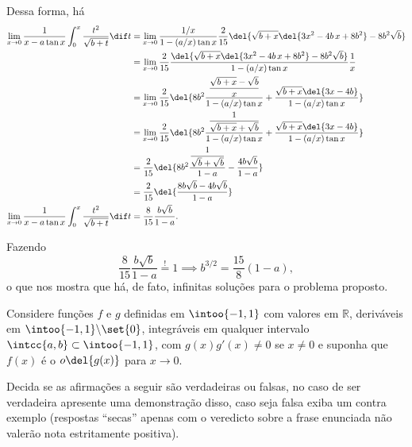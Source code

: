 \documentclass{IMTexam}
\begin{document}
\begin{questions}
\begin{solution}
            Dessa forma, há
            \begin{align*}
                \lim\limits_{x\to0}\dfrac{1}{x-a\tan x}\int_0^x \dfrac{t^2}{\sqrt{b+t}}\dif t
                &=\lim\limits_{x\to0}\dfrac{1/x}{1-(a/x)\tan x}\dfrac{2}{15}\del{\sqrt{b+x}\del{3x^2-4b\,x+8b^2}-8b^2\sqrt{b}}\\
                &=\lim\limits_{x\to0}\dfrac{2}{15}\dfrac{\del{\sqrt{b+x}\del{3x^2-4b\,x+8b^2}-8b^2\sqrt{b}}}{1-(a/x)\tan x}\dfrac{1}{x}\\
                &=\lim\limits_{x\to0}\dfrac{2}{15}\del{8b^2\dfrac{\dfrac{\sqrt{b+x}-\sqrt{b}}{x}}{1-(a/x)\tan x}+\dfrac{\sqrt{b+x}\del{3x-4b}}{1-(a/x)\tan x}}\\
                &=\lim\limits_{x\to0}\dfrac{2}{15}\del{8b^2\dfrac{\dfrac{1}{\sqrt{b+x}+\sqrt{b}}}{1-(a/x)\tan x}+\dfrac{\sqrt{b+x}\del{3x-4b}}{1-(a/x)\tan x}}\\
                &=\dfrac{2}{15}\del{8b^2\dfrac{\dfrac{1}{\sqrt{b}+\sqrt{b}}}{1-a}-\dfrac{4b\sqrt{b}}{1-a}}\\
                &=\dfrac{2}{15}\del{\dfrac{8b\sqrt{b}-4b\sqrt{b}}{1-a}}\\
                \lim\limits_{x\to0}\dfrac{1}{x-a\tan x}\int_0^x \dfrac{t^2}{\sqrt{b+t}}\dif t&=\dfrac{8}{15}\dfrac{b\sqrt{b}}{1-a}.
            \end{align*}

            Fazendo
            \[ \dfrac{8}{15}\dfrac{b\sqrt{b}}{1-a}\overset{!}{=}1\implies b^{3/2}=\dfrac{15}{8}(1-a), \]
            o que nos mostra que há, de fato, infinitas soluções para o problema proposto.
        \end{solution}

        \question Considere funções $f$ e $g$ definidas em $\intoo{-1,1}$ com valores em
        $\mathbb{R}$, deriváveis em $\intoo{-1,1}\backslash \set{0}$,
        integráveis em qualquer intervalo $\intcc{a,b}\subset\intoo{-1,1}$, com
        $g(x)g'(x)\neq 0$ se $x\neq 0$ e suponha que $f(x)$ é o $o\del{g(x)}$
        para $x\to 0$.

        Decida se as afirmações a seguir são verdadeiras ou falsas, no caso de
        ser verdadeira apresente uma demonstração disso, caso seja falsa exiba
        um contra exemplo (respostas ``secas'' apenas com o veredicto sobre a
        frase enunciada não valerão nota estritamente positiva).

\end{questions}
\end{document}
